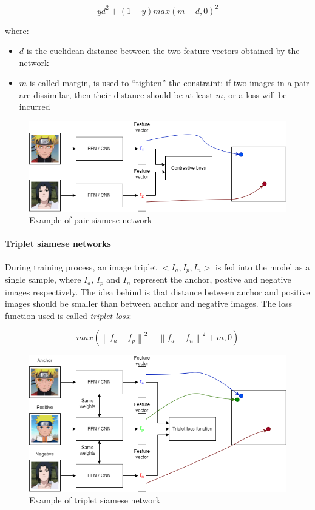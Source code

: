 \documentclass{article}
\begin{document}
$$yd^2 + (1 - y) max(m - d, 0)^2$$

where:
\begin{itemize}
    \item $d$ is the euclidean distance between the two feature vectors obtained by the network
    \item $m$ is called margin, is used to “tighten” the constraint: if two images in a pair are dissimilar, then their distance should be at least $m$, or a loss will be incurred
\end{itemize}

\begin{figure}[H]
    \centering
    \includegraphics[width=4.5in]{imgs/pairNet.png}
    \caption{Example of pair siamese network}
    \label{fig:pairNet}
\end{figure}

\paragraph{Triplet siamese networks}
During training process, an image triplet $<I_a, I_p, I_n>$ is fed into the model as a single sample, where $I_a$, $I_p$ and $I_n$ represent the anchor, postive and negative images respectively. The idea behind is that distance between anchor and positive images should be smaller than between anchor and negative images.
The loss function used is called \textit{triplet loss}:

$$max(\left\| f_a - f_p\right\|^2 - \left\| f_a - f_n\right\|^2 + m, 0) $$

\begin{figure}[H]
    \centering
    \includegraphics[width=4.5in]{imgs/TripletNet.png}
    \caption{Example of triplet siamese network}
    \label{fig:tripletNet}
\end{figure}
\end{document}
